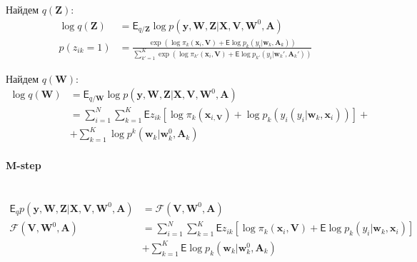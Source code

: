 \documentclass[12pt, twoside]{article}
\numberwithin{equation}{section}
\begin{document}
Найдем $q\left(\textbf{Z}\right)$:
\begin{equation}
\label{eq:st:5}
\begin{aligned}
\log q\left(\textbf{Z}\right) &= \mathsf{E}_{q/\textbf{Z}}\log p\left(\textbf{y}, \textbf{W}, \textbf{Z}|\textbf{X}, \textbf{V}, \textbf{W}^{0}, \textbf{A}\right) \\
p\left(z_{ik} = 1\right) &= \frac{\exp\left(\log\pi_{k}\left(\textbf{x}_{i}, \textbf{V}\right) + \mathsf{E}\log p_{k}\left(y_i|\textbf{w}_k, \textbf{A}_k\right)\right)}{\sum_{k'=1}^{K}\exp\left(\log\pi_{k'}\left(\textbf{x}_{i}, \textbf{V}\right) + \mathsf{E}\log p_{k'}\left(y_i|\textbf{w}_k', \textbf{A}_k'\right)\right)}
\end{aligned}
\end{equation}

Найдем $q\left(\textbf{W}\right)$:
\begin{equation}
\label{eq:st:6}
\begin{aligned}
\log q\left(\textbf{W}\right) &= \mathsf{E}_{q/\textbf{W}}\log p\left(\textbf{y}, \textbf{W}, \textbf{Z}|\textbf{X}, \textbf{V}, \textbf{W}^{0}, \textbf{A}\right) \\
&= \sum_{i=1}^{N}\sum_{k=1}^{K}\mathsf{E}z_{ik}\left[\log\pi_{k}\left(\textbf{x}_{i, \textbf{V}}\right) + \log p_{k}\left(y_{i}\left(y_{i}|\textbf{w}_{k}, \textbf{x}_i\right)\right)\right] + \\
&+ \sum_{k=1}^{K}\log p^{k}\left(\textbf{w}_{k}|\textbf{w}^{0}_{k}, \textbf{A}_{k}\right)
\end{aligned}
\end{equation}

\paragraph{M-step}~
\begin{equation}
\label{eq:st:7}
\begin{aligned}
\mathsf{E}_{q} p\left(\textbf{y}, \textbf{W}, \textbf{Z}|\textbf{X}, \textbf{V}, \textbf{W}^{0}, \textbf{A}\right) &= \mathcal{F}\left(\textbf{V}, \textbf{W}^{0}, \textbf{A}\right) \\
\mathcal{F}\left(\textbf{V}, \textbf{W}^{0}, \textbf{A}\right) &= \sum_{i=1}^{N}\sum_{k=1}^{K}\mathsf{E}z_{ik}\left[\log\pi_k\left(\textbf{x}_i, \textbf{V}\right) + \mathsf{E}\log p_{k}\left(y_i|\textbf{w}_{k}, \textbf{x}_{i}\right)\right] \\
&+ \sum_{k=1}^{K}\mathsf{E}\log p_{k}\left(\textbf{w}_{k}|\textbf{w}^{0}_{k}, \textbf{A}_{k}\right)
\end{aligned}
\end{equation}
\end{document}
